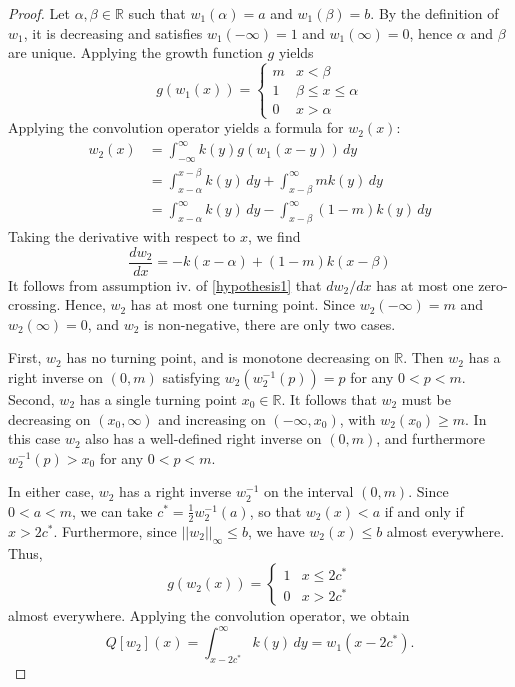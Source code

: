 \documentclass[11pt]{article}
\theoremstyle{definition}
\numberwithin{equation}{section}
\numberwithin{thm}{section}
\begin{document}
\begin{proof} Let $\alpha,\beta\in\mathbb R$ such that $w_1(\alpha)=a$ and $w_1(\beta)=b$.  By the definition of $w_1$, it is decreasing and satisfies $w_1(-\infty)=1$ and $w_1(\infty)=0$, hence $\alpha$ and $\beta$ are unique.  Applying the growth function $g$ yields
\begin{equation} \label{gw1}
g(w_1(x)) = \begin{cases}
m & x < \beta \\
1 & \beta \leq x \leq \alpha \\
0 & x > \alpha
\end{cases} \end{equation}
Applying the convolution operator yields a formula for $w_2(x)$:
\begin{equation} \label{w2}
\begin{aligned}
w_2(x) &= \int_{-\infty}^{\infty} k(y) g(w_1(x-y)) \, dy \\
&= \int_{x-\alpha}^{x-\beta} k(y)\,dy + \int_{x-\beta}^{\infty} m k(y)\,dy \\
&= \int_{x-\alpha}^{\infty} k(y)\,dy - \int_{x-\beta}^{\infty} (1-m) k(y)\,dy
\end{aligned}
\end{equation}
Taking the derivative with respect to $x$, we find
\begin{equation}
\frac{dw_2}{dx} = -k(x-\alpha) + (1-m)k(x-\beta)
\end{equation}
It follows from assumption iv. of \ref{hypothesis1} that $dw_2/dx$ has at most one zero-crossing. Hence, $w_2$ has at most one turning point. Since $w_2(-\infty)=m$ and $w_2(\infty)=0$, and $w_2$ is non-negative, there are only two cases.

First, $w_2$ has no turning point, and is monotone decreasing on $\mathbb R$. Then $w_2$ has a right inverse on $(0,m)$ satisfying $w_2(w_2^{-1}(p))=p$ for any $0<p<m$. Second, $w_2$ has a single turning point $x_0\in\mathbb R$. It follows that $w_2$ must be decreasing on $(x_0,\infty)$ and increasing on $(-\infty,x_0)$, with $w_2(x_0)\geq m$. In this case $w_2$ also has a well-defined right inverse on $(0,m)$, and furthermore $w_2^{-1}(p)>x_0$ for any $0<p<m$.

In either case, $w_2$ has a right inverse $w_2^{-1}$ on the interval $(0,m)$. Since $0<a<m$, we can take $c^*=\frac{1}{2}w_2^{-1}(a)$, so that $w_2(x)<a$ if and only if $x>2c^*$. Furthermore, since $||w_2||_\infty \leq b$, we have $w_2(x)\leq b$ almost everywhere. Thus,
\begin{equation} \label{gw2}
g(w_2(x)) = \begin{cases}
1 & x \leq 2c^* \\
0 & x > 2c^*
\end{cases}
\end{equation}
almost everywhere. Applying the convolution operator, we obtain
\begin{equation}
Q[w_2](x) = \int_{x-2c^*}^{\infty} k(y)\,dy = w_1(x-2c^*).
\end{equation}
\end{proof}
\end{document}
